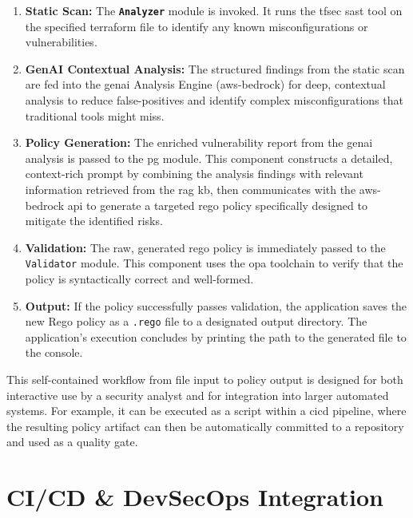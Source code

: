 \begin{enumerate}
    \item \textbf{Static Scan:} The \textbf{\texttt{Analyzer}} module is invoked. It runs the tfsec \gls{sast} tool on the specified \gls{terraform} file to identify any known misconfigurations or vulnerabilities.
    \item \textbf{GenAI Contextual Analysis:} The structured findings from the static scan are fed into the \gls{genai} Analysis Engine (\gls{aws-bedrock}) for deep, contextual analysis to reduce \glspl{false-positive} and identify complex misconfigurations that traditional tools might miss.
    \item \textbf{Policy Generation:} The enriched vulnerability report from the \gls{genai} analysis is passed to the \gls{pg} module. This component constructs a detailed, context-rich prompt by combining the analysis findings with relevant information retrieved from the \gls{rag} \gls{kb}, then communicates with the \gls{aws-bedrock} \gls{api} to generate a targeted \gls{rego} policy specifically designed to mitigate the identified risks.
    \item \textbf{Validation:} The raw, generated \gls{rego} policy is immediately passed to the \texttt{Validator} module. This component uses the \gls{opa} toolchain to verify that the policy is syntactically correct and well-formed.
    \item \textbf{Output:} If the policy successfully passes validation, the application saves the new Rego policy as a \texttt{.rego} file to a designated output directory. The application's execution concludes by printing the path to the generated file to the console.
\end{enumerate}

This self-contained workflow from file input to policy output is designed for both interactive use by a security analyst and for integration into larger automated systems. For example, it can be executed as a script within a \gls{cicd} pipeline, where the resulting policy artifact can then be automatically committed to a repository and used as a quality gate.

\section{CI/CD \& DevSecOps Integration}

